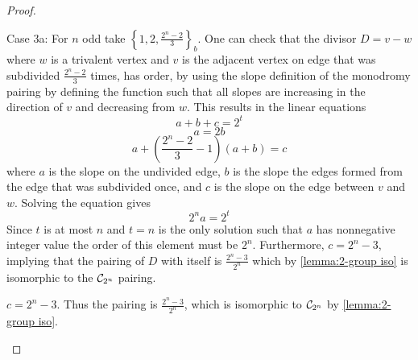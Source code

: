 \documentclass{amsart}
\begin{document}
\begin{proof}
\begin{center}
\begin{tikzpicture}
\end{tikzpicture}
\end{center}
  
   Case 3a: For $n$ odd take $\left\{1, 2,\frac{2^{n}-2}{3}\right\}_{b}$. One can check that the divisor $D=v-w$ where $w$ is a trivalent vertex and $v$ is the adjacent vertex
on edge that was subdivided $\frac{2^{n}-2}{3}$ times, has order, by using the slope
definition of the monodromy pairing by defining the function such that all slopes are increasing in the direction of $v$ and decreasing from $w$. This results in the linear equations
  \begin{equation*}
a+b+c=2^{t}
  \end{equation*}
  \begin{equation*}
a=2b
  \end{equation*}
  \begin{equation*}
a+\left(\frac{2^{n}-2}{3}-1\right)(a+b)=c
  \end{equation*}
where $a$ is the slope on the undivided edge, $b$ is the
slope the edges formed from the edge that was subdivided once, and $c$ is the slope
on the edge between $v$ and $w$. Solving the equation gives
\begin{equation*}
2^{n}a=2^{t}
\end{equation*}
Since $t$ is at most $n$ and $t=n$ is the only solution such that $a$ has nonnegative integer value the order of this element must be $2^{n}$. Furthermore, $c=2^{n}-3$, implying that the pairing of $D$ with itself is $\frac{2^{n}-3}{2^{n}}$ which by \ref{lemma:2-group iso} is isomorphic to the $\CP$ pairing.

$c=2^{n}-3$. Thus the pairing is $\frac{2^{n}-3}{2^{n}}$, which is
isomorphic to $\CP$ by \ref{lemma:2-group iso}.

\begin{center}
\end{center}
\end{proof}
\end{document}
